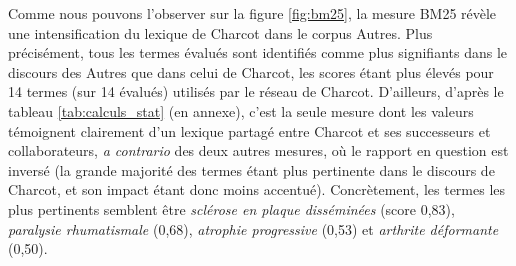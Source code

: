Comme nous pouvons l'observer sur la figure \ref{fig:bm25}, la mesure \textsc{BM25} révèle une intensification du lexique de Charcot dans le corpus \og{}Autres\fg{}. Plus précisément, tous les termes évalués sont identifiés comme plus signifiants dans le discours des \og{}Autres\fg{} que dans celui de Charcot, les scores étant plus élevés pour 14 termes (sur 14 évalués) utilisés par le réseau de Charcot. D'ailleurs, d'après le tableau \ref{tab:calculs_stat} (en annexe), c'est la seule mesure dont les valeurs témoignent clairement d'un lexique partagé entre Charcot et ses successeurs et collaborateurs, \textit{a contrario} des deux autres mesures, où le rapport en question est inversé (la grande majorité des termes étant plus pertinente dans le discours de Charcot, et son impact étant donc moins accentué). Concrètement, les termes les plus pertinents semblent être \textit{sclérose en plaque disséminées} (score 0,83), \textit{paralysie rhumatismale} (0,68), \textit{atrophie progressive} (0,53) et \textit{arthrite déformante} (0,50).
